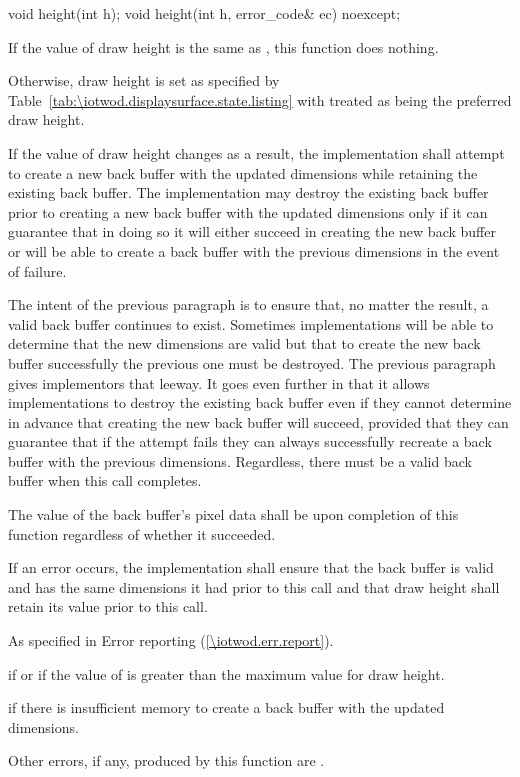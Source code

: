 %
\begin{itemdecl}
void height(int h);
void height(int h, error_code& ec) noexcept;
\end{itemdecl}
\begin{itemdescr}
\pnum
\effects
If the value of draw height is the same as , this function does nothing.

\pnum
Otherwise, draw height is set as specified by Table~\ref{tab:\iotwod.displaysurface.state.listing} with  treated as being the preferred draw height.

\pnum
If the value of draw height changes as a result, the implementation shall attempt to create a new back buffer with the updated dimensions while retaining the existing back buffer. The implementation may destroy the existing back buffer prior to creating a new back buffer with the updated dimensions only if it can guarantee that in doing so it will either succeed in creating the new back buffer or will be able to create a back buffer with the previous dimensions in the event of failure.

\pnum
\begin{note}
The intent of the previous paragraph is to ensure that, no matter the result, a valid back buffer continues to exist. Sometimes implementations will be able to determine that the new dimensions are valid but that to create the new back buffer successfully the previous one must be destroyed. The previous paragraph gives implementors that leeway. It goes even further in that it allows implementations to destroy the existing back buffer even if they cannot determine in advance that creating the new back buffer will succeed, provided that they can guarantee that if the attempt fails they can always successfully recreate a back buffer with the previous dimensions. Regardless, there must be a valid back buffer when this call completes.
\end{note}

\pnum
The value of the back buffer's pixel data shall be \unspecnorm upon completion of this function regardless of whether it succeeded.

\pnum
If an error occurs, the implementation shall ensure that the back buffer is valid and has the same dimensions it had prior to this call and that draw height shall retain its value prior to this call.

\pnum
\throws
As specified in Error reporting (\ref{\iotwod.err.report}).

\pnum
\errors
{} if  or if the value of  is greater than the maximum value for draw height.

\pnum
{} if there is insufficient memory to create a back buffer with the updated dimensions.

\pnum
Other errors, if any, produced by this function are .
\end{itemdescr}

